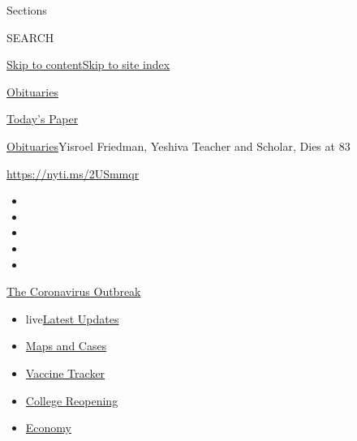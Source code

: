 Sections

SEARCH

\protect\hyperlink{site-content}{Skip to
content}\protect\hyperlink{site-index}{Skip to site index}

\href{https://www.nytimes.com/section/obituaries}{Obituaries}

\href{https://myaccount.nytimes.com/auth/login?response_type=cookie\&client_id=vi}{}

\href{https://www.nytimes.com/section/todayspaper}{Today's Paper}

\href{/section/obituaries}{Obituaries}\textbar{}Yisroel Friedman,
Yeshiva Teacher and Scholar, Dies at 83

\url{https://nyti.ms/2USmmqr}

\begin{itemize}
\item
\item
\item
\item
\item
\end{itemize}

\href{https://www.nytimes.com/news-event/coronavirus?action=click\&pgtype=Article\&state=default\&region=TOP_BANNER\&context=storylines_menu}{The
Coronavirus Outbreak}

\begin{itemize}
\tightlist
\item
  live\href{https://www.nytimes.com/2020/08/03/world/coronavirus-covid-19.html?action=click\&pgtype=Article\&state=default\&region=TOP_BANNER\&context=storylines_menu}{Latest
  Updates}
\item
  \href{https://www.nytimes.com/interactive/2020/us/coronavirus-us-cases.html?action=click\&pgtype=Article\&state=default\&region=TOP_BANNER\&context=storylines_menu}{Maps
  and Cases}
\item
  \href{https://www.nytimes.com/interactive/2020/science/coronavirus-vaccine-tracker.html?action=click\&pgtype=Article\&state=default\&region=TOP_BANNER\&context=storylines_menu}{Vaccine
  Tracker}
\item
  \href{https://www.nytimes.com/2020/08/02/us/covid-college-reopening.html?action=click\&pgtype=Article\&state=default\&region=TOP_BANNER\&context=storylines_menu}{College
  Reopening}
\item
  \href{https://www.nytimes.com/live/2020/08/03/business/stock-market-today-coronavirus?action=click\&pgtype=Article\&state=default\&region=TOP_BANNER\&context=storylines_menu}{Economy}
\end{itemize}

